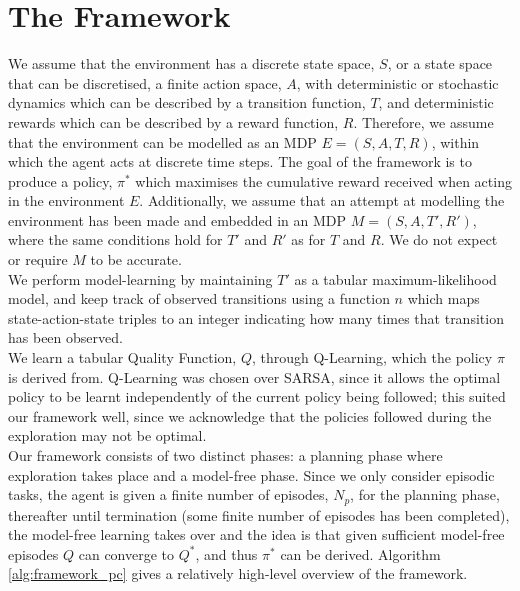 \section{The Framework}
We assume that the environment has a discrete state space, $S$, or a state space that can be discretised, a finite action space, $A$, with deterministic or stochastic dynamics which can be described by a transition function, $T$, and deterministic rewards which can be described by a reward function, $R$. Therefore, we assume that the environment can be modelled as an MDP $E = (S, A, T, R)$, within which the agent acts at discrete time steps. The goal of the framework is to produce a policy, $\pi^*$ which maximises the cumulative reward received when acting in the environment $E$.
Additionally, we assume that an attempt at modelling the environment has been made and embedded in an MDP $M = (S, A, T', R')$, where the same conditions hold for $T'$ and $R'$ as for $T$ and $R$. We do not expect or require $M$ to be accurate. 
\\We perform model-learning by maintaining $T'$ as a tabular maximum-likelihood model, and keep track of observed transitions using a function $n$ which maps state-action-state triples to an integer indicating how many times that transition has been observed.
\\We learn a tabular Quality Function, $Q$, through Q-Learning, which the policy $\pi$ is derived from. Q-Learning was chosen over SARSA, since it allows the optimal policy to be learnt independently of the current policy being followed; this suited our framework well, since we acknowledge that the policies followed during the exploration may not be optimal.
\\Our framework consists of two distinct phases: a planning phase where exploration takes place and a model-free phase. Since we only consider episodic tasks, the agent is given a finite number of episodes, $N_p$, for the planning phase, thereafter until termination (some finite number of episodes has been completed), the model-free learning takes over and the idea is that given sufficient model-free episodes $Q$ can converge to $Q^*$, and thus $\pi^*$ can be derived. Algorithm \ref{alg:framework_pc} gives a relatively high-level overview of the framework.

